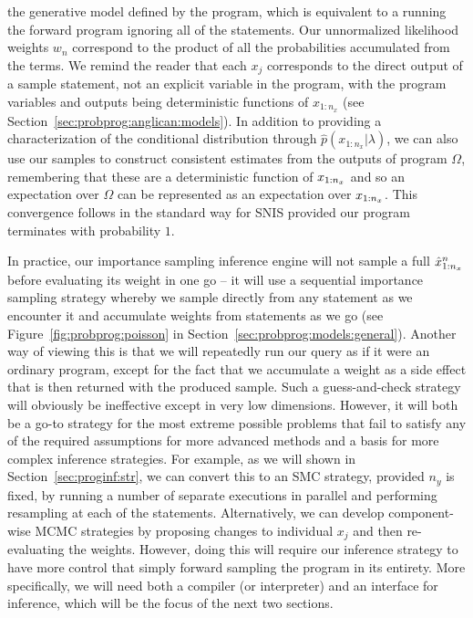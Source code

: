 the generative model defined by the program, which is equivalent to a running the forward program
ignoring all of the \observe statements.  Our unnormalized likelihood weights $w_n$ correspond to the
product of all the probabilities accumulated from the \observe terms.  We remind the reader that each 
$x_j$ corresponds to the direct output of a sample statement, not an explicit variable in the program, 
with the program variables and outputs being deterministic functions of $x_{1:n_x}$ (see 
Section~\ref{sec:probprog:anglican:models}). In addition to providing a 
characterization of the conditional distribution through $\hat{p}(x_{1:n_x} | \lambda)$, we can also
use our samples to construct consistent estimates from the outputs of program $\Omega$, remembering
that these are a deterministic function of $x_{1:n_x}$ and so an expectation over $\Omega$ can be
represented as an expectation over $x_{1:n_x}$.
This convergence follows in the standard way for SNIS provided our program terminates with probability $1$.

In practice, our importance sampling inference engine will not sample a full $\hat{x}_{1:n_x}^n$ before 
evaluating its weight in one go -- it will use a
sequential importance sampling strategy whereby we sample directly from any \sample statement as we encounter it
and accumulate weights from \observe statements as we go (see Figure~\ref{fig:probprog:poisson} in
Section~\ref{sec:probprog:models:general}).
Another way of viewing this is that we will repeatedly run our query as if it were an ordinary
program, except for the fact that we accumulate a weight as a side effect that is then returned with
the produced sample.  Such a guess-and-check strategy will obviously be ineffective except in very low
dimensions.  However, it will both be a go-to strategy for the most extreme possible problems that
fail to satisfy any of the required assumptions for more advanced methods and a basis for more complex 
inference strategies.  For example, as we will shown in Section~\ref{sec:proginf:str}, we can
convert this to an SMC strategy, provided $n_y$ is fixed, by running a number of separate executions
in parallel and performing resampling at each of the \observe statements.  Alternatively, we can
develop component-wise MCMC strategies by proposing changes to individual $x_j$ and then
re-evaluating the weights.  However, doing this will require our inference strategy to have more
control that simply forward sampling the program in its entirety.  More specifically, we will need both a compiler
(or interpreter) and an interface for inference, which will be the focus of the next two sections.